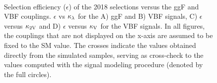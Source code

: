 \begin{figure}[htbp!]
\captionsetup[subfigure]{justification=centering}
\centering
{}
\\
\caption[Selection efficiency ($\epsilon$) of the 2018 selections versus the ggF and VBF couplings]{Selection efficiency ($\epsilon$) of the 2018 selections versus the ggF and VBF couplings. $\epsilon$ vs $\kappa_{\lambda}$ for the A) ggF and B) VBF signals, C) $\epsilon$ versus $\mathrm{\kappa_{2V} }$ and D) $\epsilon$ versus $\mathrm{\kappa_{V} }$ for the VBF signals. In all figures, the couplings that are not displayed on the x-axis are assumed to be fixed to the SM value. The crosses indicate the values obtained directly from the simulated samples, serving as cross-check to the values computed with the signal modeling procedure (denoted by the full circles).}
\label{fig:eff_sel_ggf_vbf_2018}
\end{figure}


